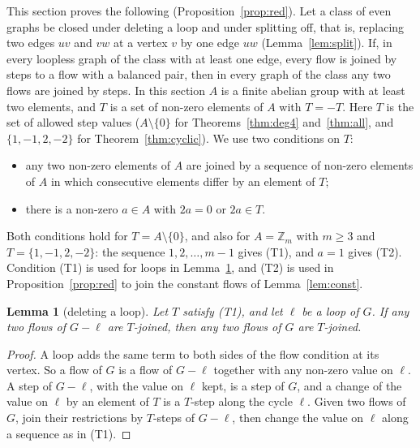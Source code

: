 \documentclass[11pt]{article}
\newtheorem{lemma}[theorem]{Lemma}
\theoremstyle{definition}
\newcommand{\Z}{\mathbb{Z}}
\begin{document}
This section proves the following (Proposition~\ref{prop:red}). Let a class of even graphs be closed under deleting a
loop and under splitting off, that is, replacing two edges $uv$ and $vw$ at a vertex $v$ by one edge $uw$
(Lemma~\ref{lem:split}). If, in every loopless graph of the class with at least one edge, every flow is joined by steps
to a flow with a balanced pair, then in every graph of the class any two flows are joined by steps. In this section $A$ is a finite abelian group with at least two elements, and $T$ is a set of non-zero elements of $A$
with $T=-T$. Here $T$ is the set of allowed step values ($A\setminus\{0\}$ for Theorems~\ref{thm:deg4} and~\ref{thm:all}, and
$\{1,-1,2,-2\}$ for Theorem~\ref{thm:cyclic}). We use two conditions on $T$:
\begin{itemize}
\item[(T1)] any two non-zero elements of $A$ are joined by a sequence of non-zero elements of $A$ in which
consecutive elements differ by an element of $T$;
\item[(T2)] there is a non-zero $a\in A$ with $2a=0$ or $2a\in T$.
\end{itemize}
Both conditions hold for $T=A\setminus\{0\}$, and also for $A=\Z_m$ with $m\ge 3$ and $T=\{1,-1,2,-2\}$: the sequence
$1,2,\dots,m-1$ gives (T1), and $a=1$ gives (T2). Condition (T1) is used for loops in Lemma~\ref{lem:loop}, and (T2) is
used in Proposition~\ref{prop:red} to join the constant flows of Lemma~\ref{lem:const}.

\begin{lemma}[deleting a loop]\label{lem:loop}
Let $T$ satisfy \textup{(T1)}, and let $\ell$ be a loop of $G$. If any two flows of $G-\ell$ are $T$-joined, then any two
flows of $G$ are $T$-joined.
\end{lemma}
\begin{proof}
A loop adds the same term to both sides of the flow condition at its vertex. So a flow of $G$ is a flow of $G-\ell$
together with any non-zero value on $\ell$. A step of $G-\ell$, with the value on $\ell$ kept, is a step of $G$, and a
change of the value on $\ell$ by an element of $T$ is a $T$-step along the cycle $\ell$. Given two flows of $G$, join their
restrictions by $T$-steps of $G-\ell$, then change the value on $\ell$ along a sequence as in \textup{(T1)}.
\end{proof}
\end{document}
